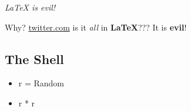 \textit{LaTeX is evil!} 

Why? \href{Why}{twitter.com} is it \textit{all} in \textbf{LaTeX}??? It is \textbf{evil}!


\subsection{The Shell}
\begin{itemize}
\item r = Random
\item r * r
\end{itemize}